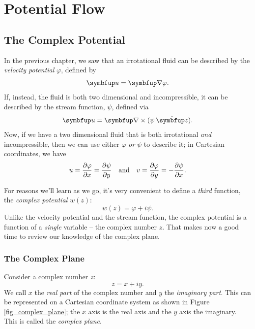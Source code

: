 \chapter{Potential Flow}

%
%

\section{The Complex Potential}

In the previous chapter, we saw that an irrotational fluid can be described by the \emph{velocity potential} $\varphi$, defined by
\begin{equation}
\vec{u} = \grad \varphi.
\end{equation}
If, instead, the fluid is both two dimensional and incompressible, it can be described by the stream function, $\psi$, defined via
\begin{equation}
\vec{u} = \grad \times (\psi \, \unit{z}).
\end{equation}
Now, if we have a two dimensional fluid that is both irrotational \emph{and} incompressible, then we can use either $\varphi$ \emph{or} $\psi$ to describe it; in Cartesian coordinates, we have
\begin{equation}
\label{eq_u_phi_psi}
u = \frac{\partial {\varphi}}{\partial {x}} = \frac{\partial {\psi}}{\partial {y}} \quad \text{and} \quad v = \frac{\partial {\varphi}}{\partial {y}} = - \frac{\partial {\psi}}{\partial {x}}.
\end{equation}

For reasons we'll learn as we go, it's very convenient to define a \emph{third} function, the \emph{complex potential} $w(z)$:
\begin{equation}
\label{eq_complex_pot}
\boxed{
w(z) = \varphi + i \psi.
}
\end{equation}
Unlike the velocity potential and the stream function, the complex potential is a function of a \emph{single} variable -- the complex number $z$.   That makes now a good time to review our knowledge of the complex plane. 


\subsection{The Complex Plane}

Consider a complex number $z$:
\begin{equation}
z = x + iy.
\end{equation}
We call $x$ the \emph{real part} of the complex number and $y$ the \emph{imaginary part}.  This can be represented on a Cartesian coordinate system as shown in Figure \ref{fig_complex_plane}; the $x$ axis is the real axis and the $y$ axis the imaginary.  This is called the \emph{complex plane}. 

